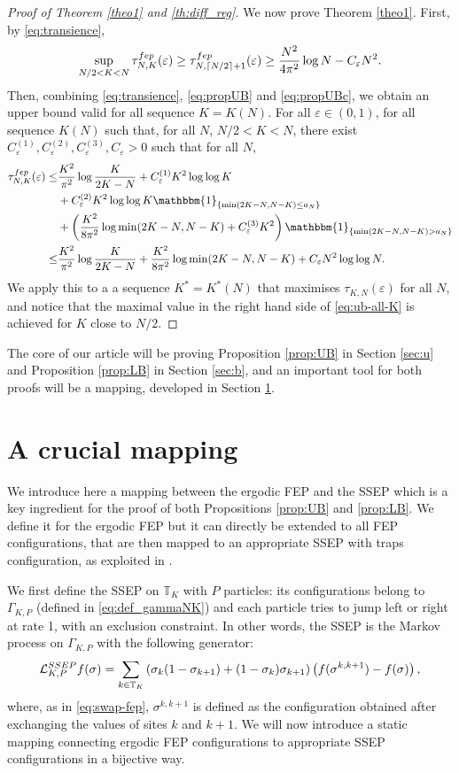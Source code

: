 \documentclass[11pt,a4paper]{article}
\newcommand{\T}{\mathbb{T}}
\newcommand{\un}{\mathbbm{1}}
\newcommand{\FEP}{\textsc{fep}}
\newcommand\entc[1]{\lceil #1 \rceil}
\newcommand{\eqs}[1]{\begin{equation}#1\end{equation}}
\begin{document}
\begin{proof}[Proof of Theorem \ref{theo1} and \ref{th:diff_reg}]
We now prove Theorem \ref{theo1}. First, by \eqref{eq:transience},
\eqs{\sup\limits_{N/2< K< N} \tau_{N,K}^{\FEP}(\varepsilon) \ge \tau_{N,\entc{N/2}+1}^{\FEP}(\varepsilon)\ge \frac{N^2}{4\pi^2}\log N - C_\varepsilon N^2.}
Then, combining \eqref{eq:transience}, \eqref{eq:propUB} and \eqref{eq:propUBc}, we obtain an upper bound valid for all sequence $K=K(N)$. For all $\varepsilon \in (0,1)$, for all sequence $K(N)$ such that, for all $N$, $N/2 < K < N$, there exist $C^{(1)}_\varepsilon,C^{(2)}_\varepsilon,C^{(3)}_\varepsilon ,C_\varepsilon>0$ such that for all $N$, 
\begin{align}
\tau_{N,K}^{\FEP}(\varepsilon) \le&  \frac{K^2}{\pi^2} \log \frac{K}{2K-N} + C^{(1)}_\varepsilon K^2 \log\log K \nonumber \\
&+ C^{(2)}_\varepsilon K^2 \log\log K \un_{\{\min(2K-N,N-K )\le a_N\}} \nonumber \\
&+ \left(\frac{K^2}{8\pi^2}\log \min (2K-N,N-K) + C_\varepsilon^{(3)}K^2\right) \un_{\{\min(2K-N,N-K )> a_N\}} \nonumber\\
\le & \frac{K^2}{\pi^2} \log\frac{K}{2K-N} + \frac{K^2}{8\pi^2} \log \min(2K-N,N-K) + C_\varepsilon N^2\log\log N. \label{eq:ub-all-K}
\end{align}
We apply this to a a sequence $K^*=K^*(N)$ that maximises $\tau_{K,N}(\varepsilon)$ for all $N$, and notice that the maximal value in the right hand side of \eqref{eq:ub-all-K} is achieved for $K$ close to $N/2$. 
\end{proof}
The core of our article will be proving Proposition \ref{prop:UB} in Section \ref{sec:u} and Proposition \ref{prop:LB} in Section \ref{sec:b}, and an important tool for both proofs will be a mapping, developed in Section \ref{sec:map}.

\section{A crucial mapping} \label{sec:map}
We introduce here a mapping between the ergodic FEP and the SSEP which is a key ingredient for the proof of both Propositions \ref{prop:UB} and \ref{prop:LB}. We define it for the ergodic FEP but it can directly be extended to all FEP configurations, that are then mapped to an appropriate SSEP with traps configuration, as exploited in \cite{erignoux_cutoff_2024}.

We first define the SSEP on $\T_K$ with $P$ particles: its configurations belong to $\Gamma_{K,P}$ (defined in \eqref{eq:def_gammaNK}) and each particle tries to jump left or right at rate 1, with an exclusion constraint. In other words, the SSEP is the Markov process on $\Gamma_{K,P}$ with the following generator:
\eqs{\mathcal{L}^{\textsc{SSEP}}_{K,P} f (\sigma) = \sum_{k\in \T_K} \left(\sigma_k(1-\sigma_{k+1}) + (1-\sigma_k)\sigma_{k+1}\right) \left(f(\sigma^{k,k+1}) - f(\sigma)\right),}
where, as in \eqref{eq:swap-fep}, $\sigma^{k,k+1}$ is defined as the configuration obtained after exchanging the values of sites $k$ and $k+1$. 
We will now introduce a static mapping connecting ergodic FEP configurations to appropriate SSEP configurations in a bijective way. 
\end{document}
